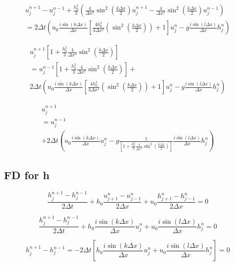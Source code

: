 \documentclass[12pt]{article}
\begin{document}
\begin{multline}
u^{n+1}_j - u^{n-1}_j
+ \frac{h_0^2}{3} \left(\frac{4}{\Delta x^2}\sin^2\left(\frac{k\Delta x}{2}\right) u^{n+1}_{j} -\frac{4}{\Delta x^2}\sin^2\left(\frac{k\Delta x}{2}\right) u^{n-1}_{j}  \right)
\\ =  2 \Delta t\left(u_0\frac{i \sin\left(k \Delta x\right)}{\Delta x}\left[\frac{4h_0^2}{3\Delta x^2}\left(\sin^2\left(\frac{k\Delta x}{2}\right)\right) + 1 \right] u^n_j   - g\frac{i \sin\left(l \Delta x\right)}{\Delta x} h^n_j\right)
\end{multline}

\begin{multline}
u^{n+1}_j \left[1 +\frac{h_0^2}{3}\frac{4}{\Delta x^2}\sin^2\left(\frac{k\Delta x}{2}\right) \right]
\\ = u^{n-1}_j \left[1 +\frac{h_0^2}{3}\frac{4}{\Delta x^2}\sin^2\left(\frac{k\Delta x}{2}\right) \right]  +  \\2 \Delta t\left(u_0\frac{i \sin\left(k \Delta x\right)}{\Delta x}\left[\frac{4h_0^2}{3\Delta x^2}\left(\sin^2\left(\frac{k\Delta x}{2}\right)\right) + 1 \right] u^n_j   - g\frac{i \sin\left(l \Delta x\right)}{\Delta x} h^n_j\right)
\end{multline}

\begin{multline}
u^{n+1}_j 
\\ = u^{n-1}_j   \\ + 2 \Delta t\left(u_0\frac{i \sin\left(k \Delta x\right)}{\Delta x} u^n_j   - g\frac{1}{\left[1 +\frac{h_0^2}{3}\frac{4}{\Delta x^2}\sin^2\left(\frac{k\Delta x}{2}\right) \right]}\frac{i \sin\left(l \Delta x\right)}{\Delta x} h^n_j\right)
\end{multline}






\subsection{FD for h}
\[\frac{h^{n+1}_j - h^{n-1}_j}{2\Delta t} + h_0\frac{u^n_{j+1} -u^n_{j-1} }{2\Delta x}  + u_0 \frac{h^n_{j+1} -h^n_{j-1} }{2\Delta x}  = 0\]


\[\frac{h^{n+1}_j - h^{n-1}_j}{2\Delta t} + h_0\frac{i \sin\left(k \Delta x\right)}{\Delta x} u^n_j  + u_0 \frac{i \sin\left(l \Delta x\right)}{\Delta x}h^{n}_{j}  = 0\]

\[h^{n+1}_j - h^{n-1}_j = -2\Delta t \left[ h_0\frac{i \sin\left(k \Delta x\right)}{\Delta x} u^n_j  +  u_0 \frac{i \sin\left(l \Delta x\right)}{\Delta x}h^{n}_{j} \right]  = 0\]
\end{document}
